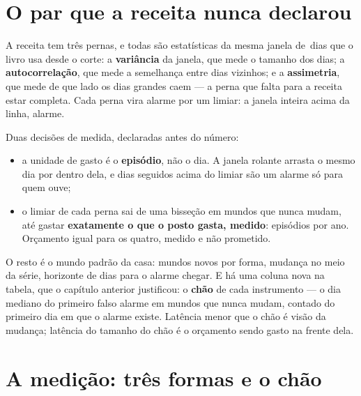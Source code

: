 \section{O par que a receita nunca declarou}

A receita tem três pernas, e todas são estatísticas da mesma janela de
\numAlertaJanela{}\,dias que o livro usa desde o corte: a \textbf{variância} da janela, que
mede o tamanho dos dias; a \textbf{autocorrelação}, que mede a semelhança entre dias vizinhos;
e a \textbf{assimetria}, que mede de que lado os dias grandes caem --- a perna que falta para
a receita estar completa. Cada perna vira alarme por um limiar: a janela inteira acima da
linha, alarme.


Duas decisões de medida, declaradas antes do número:

\begin{itemize}[leftmargin=1.5em]
  \item a unidade de gasto é o \textbf{episódio}, não o dia. A janela rolante arrasta o mesmo
    dia por dentro dela, e dias seguidos acima do limiar são um alarme só para quem ouve;
  \item o limiar de cada perna sai de uma bisseção em \numAlertaMundosParado{} mundos que
    nunca mudam, até gastar \textbf{exatamente o que o posto gasta, medido}:
    \numAlertaPostoEpisodiosAno{} episódios por ano. Orçamento igual para os quatro, medido e
    não prometido.
\end{itemize}

O resto é o mundo padrão da casa: \numAlertaCasos{} mundos novos por forma, mudança no meio
da série, horizonte de \numAlertaHorizonteDias{} dias para o alarme chegar. E há uma coluna
nova na tabela, que o capítulo anterior justificou: o \textbf{chão} de cada instrumento --- o
dia mediano do primeiro falso alarme em mundos que nunca mudam, contado do primeiro dia em que
o alarme existe. Latência menor que o chão é visão da mudança; latência do tamanho do chão é o
orçamento sendo gasto na frente dela.

\section{A medição: três formas e o chão}

